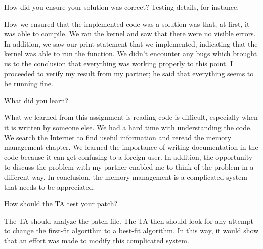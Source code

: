 \documentclass{article}
\newenvironment{question}[2][Question]{\begin{trivlist}
\item[\hskip \labelsep {\bfseries #1}\hskip \labelsep {\bfseries #2.}]}{\end{trivlist}}
\begin{document}
\begin{question}{3}
How did you ensure your solution was correct? Testing details, for instance.
\end{question}
How we ensured that the implemented code was a solution was that, at first, it was able to compile. We ran the kernel and saw that there were no visible errors. In addition, we saw our print statement that we implemented, indicating that the kernel was able to run the function. We didn't encounter any bugs which brought us to the conclusion that everything was working properly to this point.  I proceeded to verify my result from my partner; he said that everything
seems to be running fine.



\vspace{0.25in}
\begin{question}{4}
What did you learn?
\end{question}
What we learned from this assignment is reading code is difficult, especially when it is written by someone else. We had a hard time with understanding the code. We search the Internet to find useful information and reread the memory management chapter. We learned the importance of writing documentation in the code because it can get confusing to a foreign user. In addition, the opportunity to discuss the problem with my partner enabled me to think of the problem in a different way. In conclusion, the memory management is a complicated system that needs to be appreciated. 




\vspace{0.25in}
\begin{question}{5}
How should the TA test your patch?
\end{question}
The TA should analyze the patch file. The TA then should look for any attempt to change the first-fit algorithm to a best-fit algorithm. In this way, it would show that an effort was made to modify this complicated system. 



\end{document}
